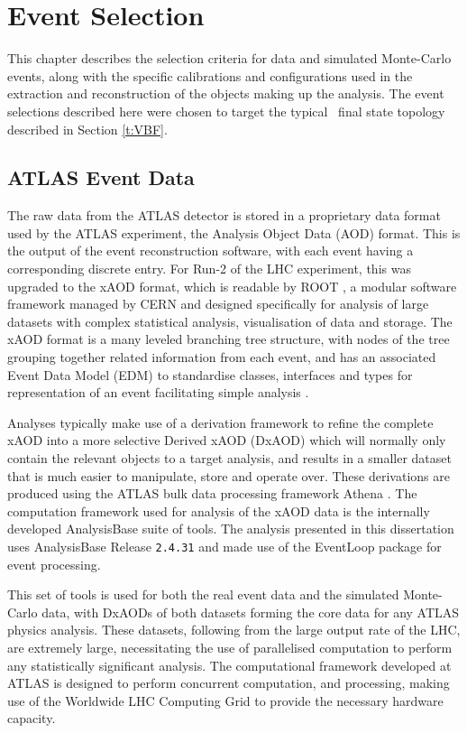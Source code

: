 \chapter{Event Selection}\label{c:ES}

	This chapter describes the selection criteria for data and simulated Monte-Carlo events, along with the specific calibrations and configurations used in the extraction and reconstruction of the objects making up the analysis. The event selections described here were chosen to target the typical \VBFHBB\, final state topology described in Section \ref{t:VBF}.

	\section{ATLAS Event Data}

	The raw data from the ATLAS detector is stored in a proprietary data format used by the ATLAS experiment, the Analysis Object Data (AOD) format. This is the output of the event reconstruction software, with each event having a corresponding discrete entry. For Run-2 of the LHC experiment, this was upgraded to the xAOD format, which is readable by ROOT \cite{ROOT}, a modular software framework managed by CERN and designed specifically for analysis of large datasets with complex statistical analysis, visualisation of data and storage. The xAOD format is a many leveled branching tree structure, with nodes of the tree grouping together related information from each event, and has an associated Event Data Model (EDM) to standardise classes, interfaces and types for representation of an event facilitating simple analysis \cite{xAOD}.

	Analyses typically make use of a derivation framework to refine the complete xAOD into a more selective Derived xAOD (DxAOD) which will normally only contain the relevant objects to a target analysis, and results in a smaller dataset that is much easier to manipulate, store and operate over. These derivations are produced using the ATLAS bulk data processing framework Athena \cite{athena}. The computation framework used for analysis of the xAOD data is the internally developed AnalysisBase suite of tools. The analysis presented in this dissertation uses AnalysisBase Release \texttt{2.4.31} and made use of the EventLoop package for event processing.

	This set of tools is used for both the real event data and the simulated Monte-Carlo data, with DxAODs of both datasets forming the core data for any ATLAS physics analysis. These datasets, following from the large output rate of the LHC, are extremely large, necessitating the use of parallelised computation to perform any statistically significant analysis. The computational framework developed at ATLAS is designed to perform concurrent computation, and processing, making use of the Worldwide LHC Computing Grid \cite{grid} to provide the necessary hardware capacity.

